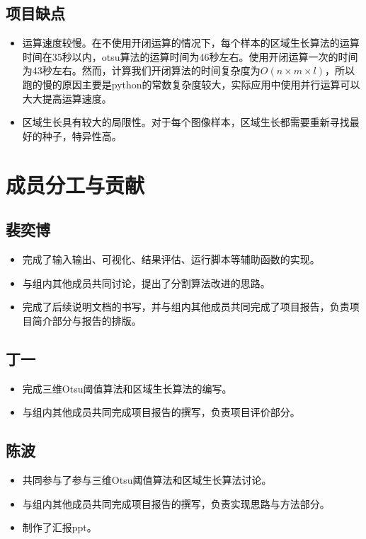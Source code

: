 \documentclass[UTF8]{ctexart}
\begin{document}
    \subsection{项目缺点}
    \begin{itemize}
        \item 运算速度较慢。在不使用开闭运算的情况下，每个样本的区域生长算法的运算时间在35秒以内，otsu算法的运算时间为46秒左右。使用开闭运算一次的时间为43秒左右。然而，计算我们开闭算法的时间复杂度为$O(n\times m \times l)$，所以跑的慢的原因主要是python的常数复杂度较大，实际应用中使用并行运算可以大大提高运算速度。
        \item 区域生长具有较大的局限性。对于每个图像样本，区域生长都需要重新寻找最好的种子，特异性高。
    \end{itemize}

\section{成员分工与贡献}
\subsection{裴奕博}
\begin{itemize}
    \item 完成了输入输出、可视化、结果评估、运行脚本等辅助函数的实现。
    \item 与组内其他成员共同讨论，提出了分割算法改进的思路。
    \item 完成了后续说明文档的书写，并与组内其他成员共同完成了项目报告，负责项目简介部分与报告的排版。
\end{itemize}
\subsection{丁一}
\begin{itemize}
    \item 完成三维Otsu阈值算法和区域生长算法的编写。
    \item 与组内其他成员共同完成项目报告的撰写，负责项目评价部分。
\end{itemize}
\subsection{陈波}
\begin{itemize}
    \item 共同参与了参与三维Otsu阈值算法和区域生长算法讨论。
    \item 与组内其他成员共同完成项目报告的撰写，负责实现思路与方法部分。
    \item 制作了汇报ppt。
    
\end{itemize}
\end{document}
